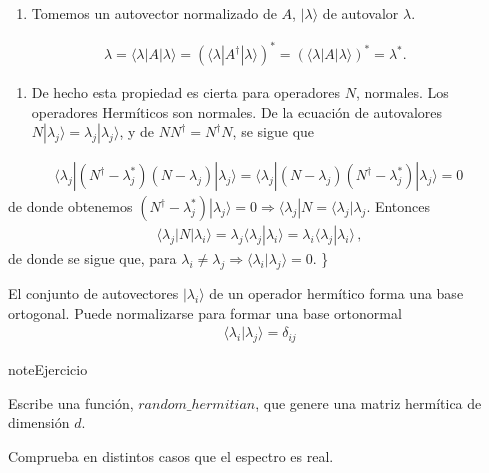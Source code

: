 \documentclass[letterpaper,10pt,english]{jupyterBook}
\newcommand{\bra}[1]{\langle #1|}
\newcommand{\ket}[1]{|#1\rangle}
\newcommand{\braket}[2]{\langle #1|#2\rangle}
\begin{document}
\begin{enumerate}
%
\item {} 
\sphinxAtStartPar
Tomemos un autovector normalizado de \(A\), \(\ket{\lambda}\) de autovalor \(\lambda\).

\end{enumerate}
\begin{equation*}
\begin{split}
\lambda = \bra{\lambda}A\ket{\lambda} =  (\bra{\lambda}A^\dagger\ket{\lambda})^* = (\bra{\lambda}A\ket{\lambda})^*= \lambda^* .~~~
\end{split}
\end{equation*}\begin{enumerate}
%
\setcounter{enumi}{1}
\item {} 
\sphinxAtStartPar
De hecho esta propiedad es cierta para operadores \(N\), normales. Los operadores Hermíticos son normales.
De la ecuación de autovalores \(N\ket{\lambda_j} =  \lambda_j \ket{\lambda_j}\), y de \(NN^\dagger = N^\dagger N\), se sigue que

\end{enumerate}
\begin{equation*}
\begin{split}
\bra{\lambda_j}(N^\dagger - \lambda_j^*)(N - \lambda_j) \ket{\lambda_j} = \bra{\lambda_j}(N - \lambda_j)(N^\dagger - \lambda_j^*) \ket{\lambda_j}  = 0\,
\end{split}
\end{equation*}
\sphinxAtStartPar
de donde obtenemos \((N^\dagger - \lambda_j^*) \ket{\lambda_j} = 0 \Rightarrow \bra{\lambda_j} N = \bra{\lambda_j}\lambda_j\). Entonces
\begin{equation*}
\begin{split}
\bra{\lambda_j}N\ket{\lambda_i} = \lambda_j \braket{\lambda_j}{\lambda_i} = \lambda_i \braket{\lambda_j}{\lambda_i} \, ,
\end{split}
\end{equation*}
\sphinxAtStartPar
de donde se sigue que, para \(\lambda_i \neq \lambda_j \Rightarrow \braket{\lambda_i}{\lambda_j} = 0\).
\}

\sphinxAtStartPar
El conjunto de autovectores \(\ket{\lambda_i}\) de un operador hermítico forma una base ortogonal. Puede normalizarse para formar una base ortonormal
\begin{equation*}
\begin{split}
\braket{\lambda_i}{\lambda_j} = \delta_{ij}
\end{split}
\end{equation*}
\begin{sphinxadmonition}{note}{Ejercicio}

\sphinxAtStartPar
Escribe una función, \(random\_hermitian\), que genere una matriz hermítica de dimensión \(d\).

\sphinxAtStartPar
Comprueba en distintos casos que el espectro es real.
\end{sphinxadmonition}
\end{document}
